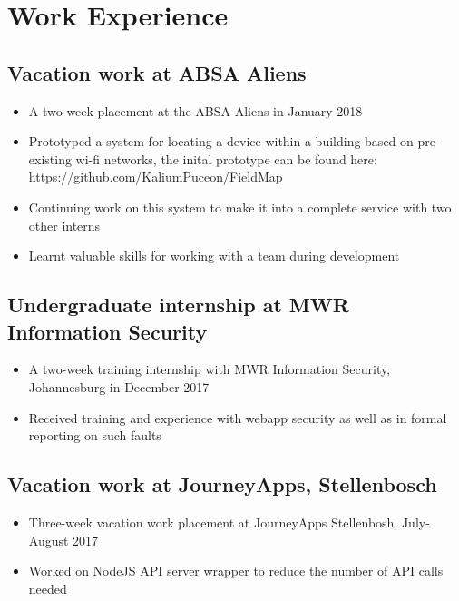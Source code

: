 \documentclass[12pt,a4paper,notitlepage]{article}
\begin{document}
\section*{Work Experience}

\subsection*{Vacation work at ABSA Aliens}
\begin{itemize}
    \item A two-week placement at the ABSA Aliens in January 2018
    \item Prototyped a system for locating a device within a building based on pre-existing wi-fi networks, the inital prototype can be found here:\\https://github.com/KaliumPuceon/FieldMap
    \item Continuing work on this system to make it into a complete service with two other interns
    \item Learnt valuable skills for working with a team during development
\end{itemize}

\subsection*{Undergraduate internship at MWR Information Security}
\begin{itemize}
    \item A two-week training internship with MWR Information Security, Johannesburg in December 2017
    \item Received training and experience with webapp security as well as in formal reporting on such faults
\end{itemize}

\subsection*{Vacation work at JourneyApps, Stellenbosch}
\begin{itemize}
    \item Three-week vacation work placement at JourneyApps Stellenbosh, July-August 2017
    \item Worked on NodeJS API server wrapper to reduce the number of API calls needed
\end{itemize}
\end{document}
